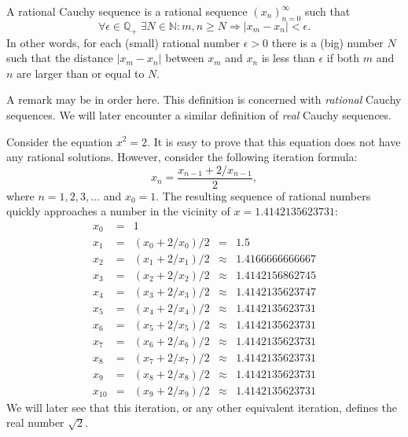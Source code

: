 \documentclass{tstextbook}
\begin{document}
\begin{definition}
  \label{th:rationalcauchysequence}
  A rational Cauchy sequence is a rational sequence
  $(x_n)_{n=0}^{\infty}$ such that
  \begin{equation}
    \forall \epsilon \in \mathbb{Q}_+ \;
    \exists N \in \mathbb{N} : m, n \geq N \Rightarrow |x_m - x_n| < \epsilon.
  \end{equation}
  In other words, for each (small) rational number $\epsilon > 0$
  there is a (big) number $N$ such that the distance $|x_m - x_n|$
  between $x_m$ and $x_n$ is less than $\epsilon$ if both $m$ and $n$
  are larger than or equal to $N$.
\end{definition}

\begin{remark}
  A remark may be in order here. This definition is concerned with
  \emph{rational} Cauchy sequences. We will later encounter a similar
  definition of \emph{real} Cauchy sequences.
\end{remark}

\begin{example}[Solving the equation $x^2 = 2$]
  Consider the equation $x^2 = 2$. It is easy to prove that this
  equation does not have any rational solutions. However, consider
  the following iteration formula:
  \begin{equation}
    x_n = \frac{x_{n-1} + 2 / x_{n - 1}}{2},
  \end{equation}
  where $n = 1,2,3,\ldots$ and $x_0 = 1$. The resulting sequence of
  rational numbers quickly approaches a number in the vicinity of
  $x = 1.4142135623731$:
  \begin{displaymath}
    \begin{array}{rclcl}
      x_0 &=& 1 \\
      x_{1} &=& (x_{0} + 2 / x_{0}) / 2 &=& 1.5 \\
      x_{2} &=& (x_{1} + 2 / x_{1}) / 2 &\approx& 1.4166666666667 \\
      x_{3} &=& (x_{2} + 2 / x_{2}) / 2 &\approx& 1.4142156862745 \\
      x_{4} &=& (x_{3} + 2 / x_{3}) / 2 &\approx& 1.4142135623747 \\
      x_{5} &=& (x_{4} + 2 / x_{4}) / 2 &\approx& 1.4142135623731 \\
      x_{6} &=& (x_{5} + 2 / x_{5}) / 2 &\approx& 1.4142135623731 \\
      x_{7} &=& (x_{6} + 2 / x_{6}) / 2 &\approx& 1.4142135623731 \\
      x_{8} &=& (x_{7} + 2 / x_{7}) / 2 &\approx& 1.4142135623731 \\
      x_{9} &=& (x_{8} + 2 / x_{8}) / 2 &\approx& 1.4142135623731 \\
      x_{10} &=& (x_{9} + 2 / x_{9}) / 2 &\approx& 1.4142135623731
    \end{array}
  \end{displaymath}
  We will later see that this iteration, or any other equivalent
  iteration, defines the real number $\sqrt{2}$.
\end{example}
\end{document}
